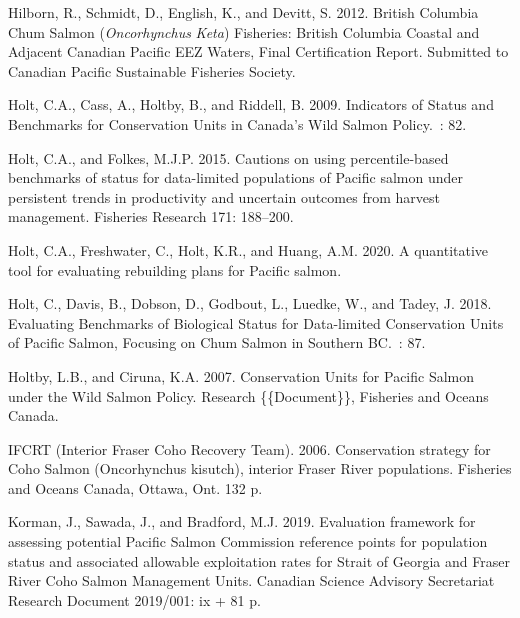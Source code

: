 \documentclass[11pt]{book}
\begin{document}
\begin{CSLReferences}{1}{0}
%
Hilborn, R., Schmidt, D., English, K., and Devitt, S. 2012. British {Columbia Chum Salmon} ({\emph{Oncorhynchus}}{ \emph{Keta}}) {Fisheries}: British {Columbia Coastal} and {Adjacent Canadian Pacific EEZ Waters}, {Final Certification Report}. {Submitted to Canadian Pacific Sustainable Fisheries Society}.

%
Holt, C.A., Cass, A., Holtby, B., and Riddell, B. 2009. Indicators of {Status} and {Benchmarks} for {Conservation Units} in {Canada}'s {Wild Salmon Policy}.~: 82.

%
Holt, C.A., and Folkes, M.J.P. 2015. Cautions on using percentile-based benchmarks of status for data-limited populations of {Pacific} salmon under persistent trends in productivity and uncertain outcomes from harvest management. Fisheries Research 171: 188--200.

%
Holt, C.A., Freshwater, C., Holt, K.R., and Huang, A.M. 2020. A quantitative tool for evaluating rebuilding plans for {Pacific} salmon.

%
Holt, C., Davis, B., Dobson, D., Godbout, L., Luedke, W., and Tadey, J. 2018. Evaluating {Benchmarks} of {Biological Status} for {Data}-limited {Conservation Units} of {Pacific Salmon}, {Focusing} on {Chum Salmon} in {Southern BC}.~: 87.

%
Holtby, L.B., and Ciruna, K.A. 2007. Conservation {Units} for {Pacific Salmon} under the {Wild Salmon Policy}. Research \{\{Document\}\}, {Fisheries and Oceans Canada}.

%
IFCRT (Interior Fraser Coho Recovery Team). 2006. Conservation strategy for {Coho Salmon} ({Oncorhynchus} kisutch), interior {Fraser River} populations. {Fisheries} and {Oceans Canada}, {Ottawa}, {Ont}. 132 p.

%
Korman, J., Sawada, J., and Bradford, M.J. 2019. Evaluation framework for assessing potential {Pacific Salmon Commission} reference points for population status and associated allowable exploitation rates for {Strait} of {Georgia} and {Fraser River Coho Salmon Management Units}. Canadian Science Advisory Secretariat Research Document 2019/001: ix + 81 p.


\end{CSLReferences}
\end{document}
